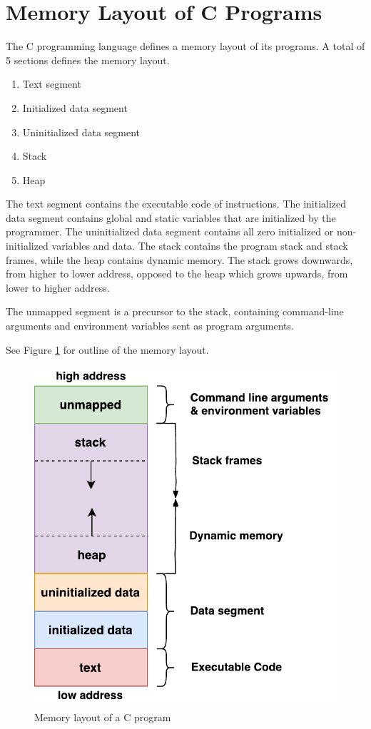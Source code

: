 \section{Memory Layout of C Programs}
\label{sec:memory_layout_c}

\FloatBarrier

The C programming language defines a memory layout of its programs. A total of 5 sections defines the memory layout.

\begin{enumerate}[topsep=0em,itemsep=-1em,partopsep=0.5em,parsep=1em]
    \item Text segment
    \item Initialized data segment
    \item Uninitialized data segment
    \item Stack
    \item Heap
\end{enumerate}

The text segment contains the executable code of instructions. The initialized data segment contains global and static variables that are initialized by the programmer. The uninitialized data segment contains all zero initialized or non\hyp{}initialized variables and data. The stack contains the program stack and stack frames, while the heap contains dynamic memory. The stack grows downwards, from higher to lower address, opposed to the heap which grows upwards, from lower to higher address. 

The unmapped segment is a precursor to the stack, containing command-line arguments and environment variables sent as program arguments. 

See Figure \ref{fig:c_memory_layout} for outline of the memory layout.

\begin{figure}[h!]
    \centering
    \includegraphics[width=0.5\linewidth]{fig/c_memory_layout}
    \caption{Memory layout of a C program}
    \label{fig:c_memory_layout}
\end{figure}

